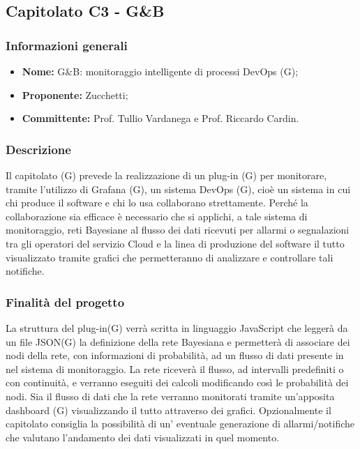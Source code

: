 \documentclass[a4paper, 11pt]{article}
\begin{document}
	\subsection{Capitolato C3 - G\&B}
	\subsubsection{Informazioni generali}
	\begin{itemize}
		\item \textbf{Nome: }G\&B: monitoraggio intelligente di processi DevOps (G);
		\item \textbf{Proponente: }Zucchetti;
		\item \textbf{Committente: }Prof. Tullio Vardanega e Prof. Riccardo Cardin.
	\end{itemize}
	\subsubsection{Descrizione}
		Il capitolato (G) prevede la realizzazione di un plug-in (G) per monitorare, tramite l'utilizzo di Grafana (G), un sistema 				DevOps (G), cioè un sistema in cui chi produce il software e chi lo usa collaborano strettamente. Perché la collaborazione 		sia efficace è necessario che si applichi, a tale sistema di monitoraggio, reti Bayesiane al flusso dei dati ricevuti per 				allarmi o segnalazioni tra gli operatori del servizio Cloud e la linea di produzione del software il tutto visualizzato tramite 				grafici che permetteranno di analizzare e controllare tali notifiche.
	\subsubsection{Finalità del progetto}
		La struttura del plug-in(G) verrà scritta in linguaggio JavaScript che leggerà da un file JSON(G) la definizione della rete 				Bayesiana e permetterà di associare dei nodi della rete, con informazioni di probabilità, ad un flusso di dati presente in 				nel sistema di monitoraggio. La rete riceverà il flusso, ad intervalli predefiniti o con continuità, e verranno eseguiti dei 				calcoli modificando così le probabilità dei nodi. Sia il flusso di dati che la rete verranno monitorati tramite un'apposita 				dashboard (G) visualizzando il tutto attraverso dei grafici. Opzionalmente il capitolato consiglia la possibilità di 					un' eventuale generazione di allarmi/notifiche che valutano l'andamento dei dati visualizzati in quel momento.
\end{document}
